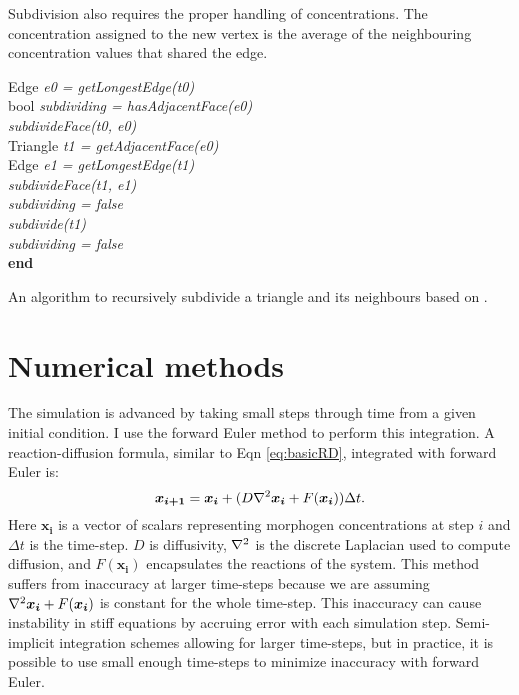 Subdivision also requires the proper handling of concentrations. The concentration assigned to the new vertex is the average of the neighbouring concentration values that shared the edge.

\begin{algorithm}[!ht]
  {
   Edge \textit{e0 = getLongestEdge(t0)}\\
   bool \textit{subdividing = hasAdjacentFace(e0)}\\
   \textit{subdivideFace(t0, e0)}\\
   {
    {
      Triangle \textit{t1 = getAdjacentFace(e0)}\\
      Edge \textit{e1 = getLongestEdge(t1)}\\
      {
       \textit{subdivideFace(t1, e1)}\\
       \textit{subdividing = false}\\
      }{
        \textit{subdivide(t1)}\\   
      }
    }{
     \textit{subdividing = false}\\
    }
   }
  }
  \textbf{end}
  \caption{An algorithm to recursively subdivide a triangle and its neighbours based on \citep{rivara1998}.}
  \label{alg:subdivisionAlgorithm}
\end{algorithm}

\section{Numerical methods}
The simulation is advanced by taking small steps through time from a given initial condition. I use the forward Euler method to perform this integration. A reaction-diffusion formula, similar to Eqn \ref{eq:basicRD}, integrated with forward Euler is:
\begin{equation}
	\boldsymbol{x_{i+1}} = \boldsymbol{x_{i}} + (D\nabla^2{}\boldsymbol{x_i} + F(\boldsymbol{x_i}))\Delta t. \\
\end{equation}
Here $\boldsymbol{x_i}$ is a vector of scalars representing morphogen concentrations at step $i$ and $\Delta t$ is the time-step. $D$ is diffusivity, $\nabla^2{}$ is the discrete Laplacian used to compute diffusion, and $F(\boldsymbol{x_i})$ encapsulates the reactions of the system. This method suffers from inaccuracy at larger time-steps because we are assuming $\nabla^2{}\boldsymbol{x_i} + F(\boldsymbol{x_i})$ is constant for the whole time-step. This inaccuracy can cause instability in stiff equations by accruing error with each simulation step. Semi-implicit integration schemes \citep{Nie2006} allowing for larger time-steps, but in practice, it is possible to use small enough time-steps to minimize inaccuracy with forward Euler. 